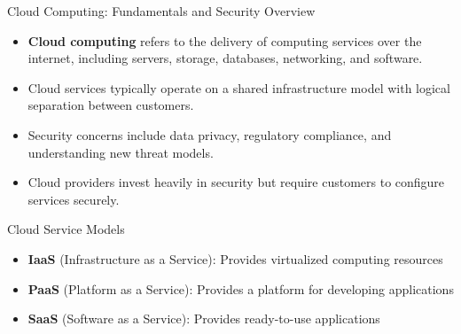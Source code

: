 \documentclass{beamer}
\begin{document}
\begin{frame}{Cloud Computing: Fundamentals and Security Overview}
\begin{itemize}
\item \textbf{Cloud computing} refers to the delivery of computing services over the internet, including servers, storage, databases, networking, and software.
\item Cloud services typically operate on a shared infrastructure model with logical separation between customers.
\item Security concerns include data privacy, regulatory compliance, and understanding new threat models.
\item Cloud providers invest heavily in security but require customers to configure services securely.
\end{itemize}

\begin{block}{Cloud Service Models}
\begin{itemize}
\item \textbf{IaaS} (Infrastructure as a Service): Provides virtualized computing resources
\item \textbf{PaaS} (Platform as a Service): Provides a platform for developing applications
\item \textbf{SaaS} (Software as a Service): Provides ready-to-use applications
\end{itemize}
\end{block}
\end{frame}
\end{document}
